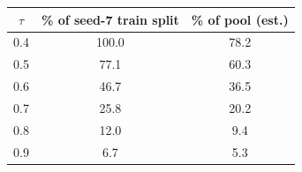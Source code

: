 \begin{tabular}{ccc}
\toprule
$\tau$ & \% of seed-7 train split & \% of pool (est.) \\
\midrule
0.4 & 100.0 & 78.2 \\
0.5 & 77.1 & 60.3 \\
0.6 & 46.7 & 36.5 \\
0.7 & 25.8 & 20.2 \\
0.8 & 12.0 & 9.4 \\
0.9 & 6.7 & 5.3 \\
\bottomrule
\end{tabular}
